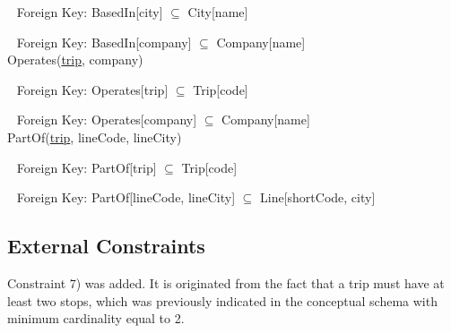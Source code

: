 	$ \ \ $ Foreign Key: BasedIn[city] $\subseteq$ City[name]
	
	$ \ \ $ Foreign Key: BasedIn[company] $\subseteq$ Company[name] \\
	
	
	Operates(\uline{trip}, company)
	
	$ \ \ $ Foreign Key: Operates[trip] $\subseteq$ Trip[code]
	
	$ \ \ $ Foreign Key: Operates[company] $\subseteq$ Company[name] \\
	
	
	PartOf(\uline{trip}, lineCode, lineCity)
	
	$ \ \ $ Foreign Key: PartOf[trip] $\subseteq$ Trip[code]
	
	$ \ \ $ Foreign Key: PartOf[lineCode, lineCity] $\subseteq$ Line[shortCode, city]
	
	
\subsection{External Constraints}

	Constraint 7) was added. It is originated from the fact that a trip must have at least two stops, which was previously indicated in the conceptual schema with minimum cardinality equal to 2.
	
